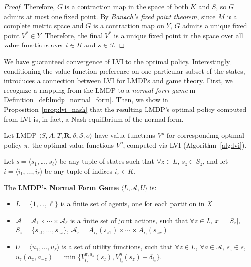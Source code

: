 \begin{proof}
Therefore, $G$ is a contraction map in the space of both $K$ and $S$, so $G$ admits at most one fixed point. By \emph{Banach's fixed point theorem}, since $M$ is a complete metric space and $G$ is a contraction map on $Y$, $G$ admits a unique fixed point $V^* \in Y$. Therefore, the final $V^*$ is a unique fixed point in the space over all value functions over $i \in K$ and $s \in S$.
\end{proof}

We have guaranteed convergence of LVI to the optimal policy. Interestingly, conditioning the value function preference on one particular subset of the states, introduces a connection between LVI for LMDPs and game theory. First, we recognize a mapping from the LMDP to a \emph{normal form game} in Definition~\ref{def:lmdp_normal_form}. Then, we show in Proposition~\ref{prop:lvi_nash} that the resulting LMDP's optimal policy computed from LVI is, in fact, a Nash equilibrium of the normal form.

\begin{definition}
    \label{def:lmdp_normal_form}
    Let LMDP $\langle S, A, T, \mathbf{R}, \delta, \mathcal{S}, o \rangle$ have value functions $V^\pi$ for corresponding optimal policy $\pi$, the optimal value functions $V^\eta$, computed via LVI (Algorithm~\ref{alg:lvi}).

    Let $\bar{s} = \langle s_1, \ldots, s_\ell \rangle$ be any tuple of states such that $\forall z \in L$, $s_z \in S_z$, and let $\bar{i} = \langle i_1, \ldots, i_\ell \rangle$ be any tuple of indices $i_z \in K$.

    The \textbf{LMDP's Normal Form Game} $\langle L, \mathcal{A}, U \rangle$ is:
    \begin{itemize}
        \item $L = \{1, \ldots, \ell\}$ is a finite set of agents, one for each partition in $X$
        \item $\mathcal{A} = \mathcal{A}_1 \times \cdots \times \mathcal{A}_\ell$ is a finite set of joint actions, such that $\forall z \in L$, $x = |S_z|$, $S_z = \{s_{z1}, \ldots, s_{zx}\}$, $\mathcal{A}_z = A_{i_z}(s_{z1}) \times \cdots \times A_{i_z}(s_{zx})$
        \item $U = \langle u_1, \ldots, u_\ell \rangle$ is a set of utility functions, such that $\forall z \in L$, $\forall a \in \mathcal{A}$, $s_z \in \bar{s}$, $u_z(a_z, a_{-z}) = \min \{ V_{i_z}^{\pi, a_z} (s_z), V_{i_z}^\eta (s_z) - \delta_{i_z} \}$.
    \end{itemize}
\end{definition}

